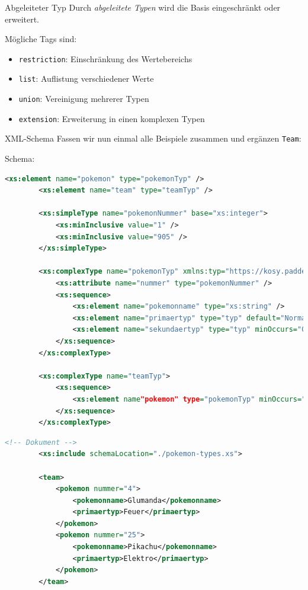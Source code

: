 \begin{bonus}{Abgeleiteter Typ}
    Durch \emph{abgeleitete Typen} wird die Basis eingeschränkt oder erweitert.
    
    Mögliche Tags sind:
    
    \begin{itemize}
        \item \texttt{restriction}: Einschränkung des Wertebereichs
        \item \texttt{list}: Auflistung verschiedener Werte
        \item \texttt{union}: Vereinigung mehrerer Typen
        \item \texttt{extension}: Erweiterung in einen komplexen Typen
    \end{itemize}
\end{bonus}

\begin{example}{XML-Schema}
    Fassen wir nun einmal alle Beispiele zusammen und ergänzen \texttt{Team}:
    
    Schema:
    \begin{lstlisting}[language=XML]
        <xs:element name="pokemon" type="pokemonTyp" />
        <xs:element name="team" type="teamTyp" />

        <xs:simpleType name="pokemonNummer" base="xs:integer">
            <xs:minInclusive value="1" />
            <xs:minInclusive value="905" />
        </xs:simpleType>

        <xs:complexType name="pokemonTyp" xmlns:typ="https://kosy.paddel.xyz/typ">
            <xs:attribute name="nummer" type="pokemonNummer" />
            <xs:sequence>
                <xs:element name="pokemonname" type="xs:string" />
                <xs:element name="primaertyp" type="typ" default="Normal" />
                <xs:element name="sekundaertyp" type="typ" minOccurs="0" />
            </xs:sequence>
        </xs:complexType>

        <xs:complexType name="teamTyp">
            <xs:sequence>
                <xs:element name"pokemon" type="pokemonTyp" minOccurs="0" maxOccurs="6" />
            </xs:sequence>
        </xs:complexType>
    \end{lstlisting}
    
    \begin{lstlisting}[language=XML]
        <!-- Dokument -->
        <xs:include schemaLocation="./pokemon-types.xs">

        <team>
            <pokemon nummer="4">
                <pokemonname>Glumanda</pokemonname>
                <primaertyp>Feuer</primaertyp>
            </pokemon>
            <pokemon nummer="25">
                <pokemonname>Pikachu</pokemonname>
                <primaertyp>Elektro</primaertyp>
            </pokemon>
        </team>
    \end{lstlisting}
\end{example}

